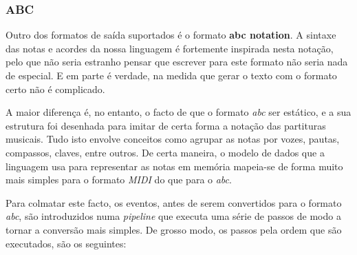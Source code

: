 \subsubsection{ABC}
Outro dos formatos de saída suportados é o formato \textbf{abc notation}. A sintaxe das notas e acordes da nossa linguagem é fortemente inspirada nesta notação, pelo que não seria estranho pensar que escrever para este formato não seria nada de especial. E em parte é verdade, na medida que gerar o texto com o formato certo não é complicado.

A maior diferença é, no entanto, o facto de que o formato \textit{abc} ser estático, e a sua estrutura foi desenhada para imitar de certa forma a notação das partituras musicais. Tudo isto envolve conceitos como agrupar as notas por vozes, pautas, compassos, claves, entre outros. De certa maneira, o modelo de dados que a linguagem usa para representar as notas em memória mapeia-se de forma muito mais simples para o formato \textit{MIDI} do que para o \textit{abc}.

Para colmatar este facto, os eventos, antes de serem convertidos para o formato \textit{abc}, são introduzidos numa \textit{pipeline} que executa uma série de passos de modo a tornar a conversão mais simples. De grosso modo, os passos pela ordem que são executados, são os seguintes:

